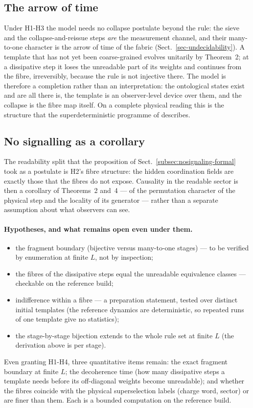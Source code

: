 \subsection{The arrow of time}\label{bridge:arrow}
Under H1-H3 the model needs no collapse postulate beyond the rule: the sieve and
the collapse-and-reissue steps \emph{are} the measurement channel, and their
many-to-one character is the arrow of time of the fabric
(Sect.~\ref{sec-undecidability}).  A template that has not yet been coarse-grained
evolves unitarily by Theorem~2; at a dissipative step it loses the unreadable part
of its weights and continues from the fibre, irreversibly, because the rule is not
injective there.  The model is therefore a completion rather than an
interpretation: the ontological states exist and are all there is, the template is
an observer-level device over them, and the collapse is the fibre map itself.  On a
complete physical reading this is the structure that the superdeterministic
programme of \cite{hossenfelder2020rethinking} describes.

\subsection{No signalling as a corollary}\label{bridge:nosignal}
The readability split that the proposition of Sect.~\ref{subsec:nosignaling-formal}
took as a postulate is H2's fibre structure: the hidden coordination fields are
exactly those that the fibres do not expose.  Causality in the readable sector is
then a corollary of Theorems~2 and~4 --- of the permutation character of the
physical step and the locality of its generator --- rather than a separate
assumption about what observers can see.

\paragraph{Hypotheses, and what remains open even under them.}
\begin{itemize}
\item[(H1)] the fragment boundary (bijective versus many-to-one stages) --- to be
verified by enumeration at finite $L$, not by inspection;
\item[(H2)] the fibres of the dissipative steps equal the unreadable equivalence
classes --- checkable on the reference build;
\item[(H3)] indifference within a fibre --- a preparation statement, tested over
distinct initial templates (the reference dynamics are deterministic, so repeated
runs of one template give no statistics);
\item[(H4)] the stage-by-stage bijection extends to the whole rule set at finite
$L$ (the derivation above is per stage).
\end{itemize}
Even granting H1-H4, three quantitative items remain: the exact fragment boundary
at finite $L$; the decoherence time (how many dissipative steps a template needs
before its off-diagonal weights become unreadable); and whether the fibres
coincide with the physical superselection labels (charge word, sector) or are
finer than them.  Each is a bounded computation on the reference build.

